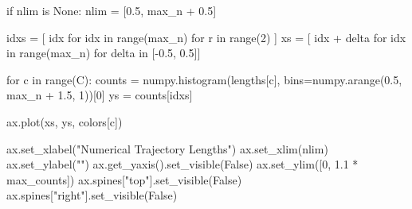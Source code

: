 \documentclass[
  letterpaper,
  DIV=11,
  numbers=noendperiod]{scrartcl}
\newenvironment{Shaded}{\begin{snugshade}}{\end{snugshade}}
\newcommand{\BuiltInTok}[1]{\textcolor[rgb]{0.00,0.23,0.31}{#1}}
\newcommand{\ControlFlowTok}[1]{\textcolor[rgb]{0.00,0.23,0.31}{#1}}
\newcommand{\DecValTok}[1]{\textcolor[rgb]{0.68,0.00,0.00}{#1}}
\newcommand{\FloatTok}[1]{\textcolor[rgb]{0.68,0.00,0.00}{#1}}
\newcommand{\KeywordTok}[1]{\textcolor[rgb]{0.00,0.23,0.31}{#1}}
\newcommand{\NormalTok}[1]{\textcolor[rgb]{0.00,0.23,0.31}{#1}}
\newcommand{\OperatorTok}[1]{\textcolor[rgb]{0.37,0.37,0.37}{#1}}
\newcommand{\StringTok}[1]{\textcolor[rgb]{0.13,0.47,0.30}{#1}}
\newcommand{\VariableTok}[1]{\textcolor[rgb]{0.07,0.07,0.07}{#1}}
\begin{document}
\begin{Shaded}
\begin{Highlighting}[]
  \ControlFlowTok{if}\NormalTok{ nlim }\KeywordTok{is} \VariableTok{None}\NormalTok{:}
\NormalTok{    nlim }\OperatorTok{=}\NormalTok{ [}\FloatTok{0.5}\NormalTok{, max\_n }\OperatorTok{+} \FloatTok{0.5}\NormalTok{]}
  
\NormalTok{  idxs }\OperatorTok{=}\NormalTok{ [ idx }\ControlFlowTok{for}\NormalTok{ idx }\KeywordTok{in} \BuiltInTok{range}\NormalTok{(max\_n) }\ControlFlowTok{for}\NormalTok{ r }\KeywordTok{in} \BuiltInTok{range}\NormalTok{(}\DecValTok{2}\NormalTok{) ]}
\NormalTok{  xs }\OperatorTok{=}\NormalTok{ [ idx }\OperatorTok{+}\NormalTok{ delta }\ControlFlowTok{for}\NormalTok{ idx }\KeywordTok{in} \BuiltInTok{range}\NormalTok{(max\_n) }\ControlFlowTok{for}\NormalTok{ delta }\KeywordTok{in}\NormalTok{ [}\OperatorTok{{-}}\FloatTok{0.5}\NormalTok{, }\FloatTok{0.5}\NormalTok{]]}
  
  \ControlFlowTok{for}\NormalTok{ c }\KeywordTok{in} \BuiltInTok{range}\NormalTok{(C):}
\NormalTok{    counts }\OperatorTok{=}\NormalTok{ numpy.histogram(lengths[c], }
\NormalTok{                             bins}\OperatorTok{=}\NormalTok{numpy.arange(}\FloatTok{0.5}\NormalTok{, max\_n }\OperatorTok{+} \FloatTok{1.5}\NormalTok{, }\DecValTok{1}\NormalTok{))[}\DecValTok{0}\NormalTok{]}
\NormalTok{    ys }\OperatorTok{=}\NormalTok{ counts[idxs]}
    
\NormalTok{    ax.plot(xs, ys, colors[c])}
  
\NormalTok{  ax.set\_xlabel(}\StringTok{"Numerical Trajectory Lengths"}\NormalTok{)}
\NormalTok{  ax.set\_xlim(nlim)}
\NormalTok{  ax.set\_ylabel(}\StringTok{""}\NormalTok{)}
\NormalTok{  ax.get\_yaxis().set\_visible(}\VariableTok{False}\NormalTok{)}
\NormalTok{  ax.set\_ylim([}\DecValTok{0}\NormalTok{, }\FloatTok{1.1} \OperatorTok{*}\NormalTok{ max\_counts])}
\NormalTok{  ax.spines[}\StringTok{"top"}\NormalTok{].set\_visible(}\VariableTok{False}\NormalTok{)}
\NormalTok{  ax.spines[}\StringTok{"right"}\NormalTok{].set\_visible(}\VariableTok{False}\NormalTok{)}
\end{Highlighting}
\end{Shaded}
\end{document}
